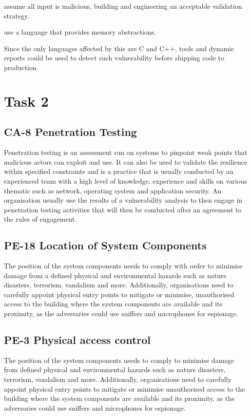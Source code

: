 \begin{description}[align=left]
  \item [Implementation] assume all input is malicious, building and
  engineering an acceptable validation strategy.
  \item [Architecture] use a language that provides memory abstractions.
\end{description}

Since the only languages affected by this are C and C++, tools and dynamic
reports could be used to detect such vulnerability before shipping code to
production.

\section{Task 2}
\label{lab4-task2}

\subsection{CA-8 Penetration Testing}
\label{lab4-sub-1}

Penetration testing is an assessment run on systems to pinpoint weak points that
malicious actors can exploit and use. It can also be used to validate the
resilience within specified constraints and is a practice that is usually
conducted by an experienced team with a high level of knowledge, experience and
skills on various thematic such as network, operating system and application
security. An organisation usually use the results of a vulnerability analysis to
then engage in penetration testing activities that will then be conducted after
an agreement to the rules of engagement.

\subsection{PE-18 Location of System Components}
\label{lab4-sub-2}
The position of the system components needs to comply with order to minimise
damage from a defined physical and environmental hazards such as nature
disasters, terrorism, vandalism and more. Additionally, organisations need to
carefully appoint physical entry points to mitigate or minimise, unauthorised
access to the building where the system components are available and its
proximity, as the adversaries could use sniffers and microphones for espionage.

\subsection{PE-3 Physical access control}
\label{lab4-sub-3}
The position of the system components needs to comply to minimise damage from
defined physical and environmental hazards such as nature disasters, terrorism,
vandalism and more. Additionally, organisations need to carefully appoint
physical entry points to mitigate or minimise unauthorised access to the
building where the system components are available and its proximity, as the
adversaries could use sniffers and microphones for espionage.

